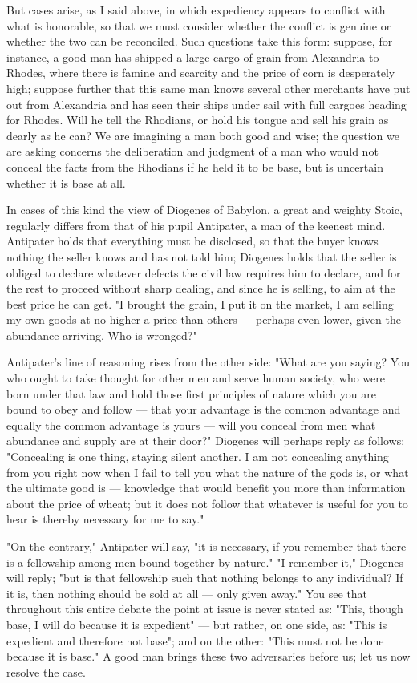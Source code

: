  But cases arise, as I said above, in which expediency appears to conflict with what is honorable, so that we must consider whether the conflict is genuine or whether the two can be reconciled. Such questions take this form: suppose, for instance, a good man has shipped a large cargo of grain from Alexandria to Rhodes, where there is famine and scarcity and the price of corn is desperately high; suppose further that this same man knows several other merchants have put out from Alexandria and has seen their ships under sail with full cargoes heading for Rhodes. Will he tell the Rhodians, or hold his tongue and sell his grain as dearly as he can? We are imagining a man both good and wise; the question we are asking concerns the deliberation and judgment of a man who would not conceal the facts from the Rhodians if he held it to be base, but is uncertain whether it is base at all.

 In cases of this kind the view of Diogenes of Babylon, a great and weighty Stoic, regularly differs from that of his pupil Antipater, a man of the keenest mind. Antipater holds that everything must be disclosed, so that the buyer knows nothing the seller knows and has not told him; Diogenes holds that the seller is obliged to declare whatever defects the civil law requires him to declare, and for the rest to proceed without sharp dealing, and since he is selling, to aim at the best price he can get. "I brought the grain, I put it on the market, I am selling my own goods at no higher a price than others — perhaps even lower, given the abundance arriving. Who is wronged?"

 Antipater's line of reasoning rises from the other side: "What are you saying? You who ought to take thought for other men and serve human society, who were born under that law and hold those first principles of nature which you are bound to obey and follow — that your advantage is the common advantage and equally the common advantage is yours — will you conceal from men what abundance and supply are at their door?" Diogenes will perhaps reply as follows: "Concealing is one thing, staying silent another. I am not concealing anything from you right now when I fail to tell you what the nature of the gods is, or what the ultimate good is — knowledge that would benefit you more than information about the price of wheat; but it does not follow that whatever is useful for you to hear is thereby necessary for me to say."

 "On the contrary," Antipater will say, "it is necessary, if you remember that there is a fellowship among men bound together by nature." "I remember it," Diogenes will reply; "but is that fellowship such that nothing belongs to any individual? If it is, then nothing should be sold at all — only given away." You see that throughout this entire debate the point at issue is never stated as: "This, though base, I will do because it is expedient" — but rather, on one side, as: "This is expedient and therefore not base"; and on the other: "This must not be done because it is base." A good man brings these two adversaries before us; let us now resolve the case.

